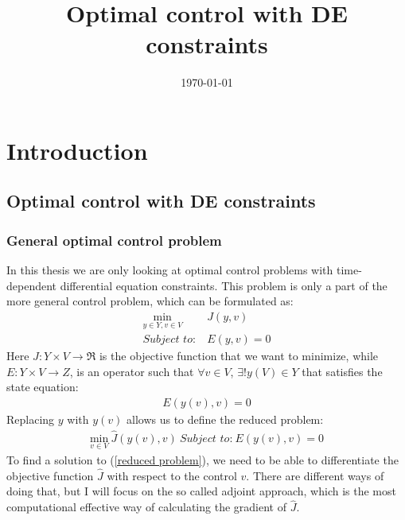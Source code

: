 \documentclass[11pt,a4paper]{article}
\date{\today}
\title{Optimal control with DE constraints}
\begin{document}
\maketitle
\tableofcontents{}

\section{Introduction}
\subsection{Optimal control with DE constraints}
\subsubsection{General optimal control problem}
In this thesis we are only looking at optimal control problems with time-dependent differential equation constraints. This problem is only a part of the more general control problem, which can be formulated as:
\begin{align}
\underset{y\in Y,v\in V}{\text{min}} \ &J(y,v) \\
\textit{Subject to:} \ &E(y,v)=0
\end{align}
Here $J: Y\times V\rightarrow\Re$ is the objective function that we want to minimize, while $E:Y\times V \rightarrow Z$, is an operator such that $\forall v \in V$, $\exists! y(V)\in Y$ that satisfies the state equation:
\begin{align*}
E(y(v),v)=0
\end{align*}
Replacing $y$ with $y(v)$ allows us to define the reduced problem:
\begin{align}
\underset{v\in V}{\text{min}} \ \hat J(y(v),v) \ \textit{Subject to:} \ E(y(v),v)=0 \label{reduced problem}
\end{align}
To find a solution to (\ref{reduced problem}), we need to be able to differentiate the objective function $\hat{J}$ with respect to the control $v$. There are different ways of doing that, but I will focus on the so called adjoint approach, which is the most computational effective way of calculating the gradient of $\hat{J}$.
\end{document}
